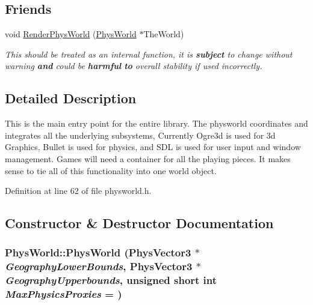 \subsection*{Friends}
\begin{DoxyCompactItemize}
\item 
\hypertarget{classPhysWorld_a54ca2a75bbccb9b2129f434874f1e693}{
void \hyperlink{classPhysWorld_a54ca2a75bbccb9b2129f434874f1e693}{RenderPhysWorld} (\hyperlink{classPhysWorld}{PhysWorld} $\ast$TheWorld)}
\label{db/df5/classPhysWorld_a54ca2a75bbccb9b2129f434874f1e693}

\begin{DoxyCompactList}\small\item\em This should be treated as an internal function, it is {\bfseries subject} to change without warning {\bfseries and} could be {\bfseries harmful} {\bfseries to} overall stability if used incorrectly. \item\end{DoxyCompactList}\end{DoxyCompactItemize}


\subsection{Detailed Description}
This is the main entry point for the entire library. The physworld coordinates and integrates all the underlying subsystems, Currently Ogre3d is used for 3d Graphics, Bullet is used for physics, and SDL is used for user input and window management. Games will need a container for all the playing pieces. It makes sense to tie all of this functionality into one world object. 

Definition at line 62 of file physworld.h.

\subsection{Constructor \& Destructor Documentation}
\hypertarget{classPhysWorld_a3228c98369082139722d3c918d735e6c}{
\subsubsection[{PhysWorld}]{\setlength{\rightskip}{0pt plus 5cm}PhysWorld::PhysWorld ({\bf PhysVector3} $\ast$ {\em GeographyLowerBounds}, \/  {\bf PhysVector3} $\ast$ {\em GeographyUpperbounds}, \/  unsigned short int {\em MaxPhysicsProxies} = {})}}
\label{db/df5/classPhysWorld_a3228c98369082139722d3c918d735e6c}


